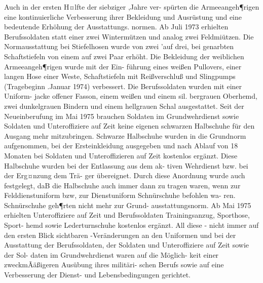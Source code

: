 

Auch in der ersten H¤lfte der siebziger ,Jahre ver-
spürten die Armeeangeh¶rigen eine kontinuierliche
Verbesserung ihrer Bekleidung und Ausrüstung
und eine bedeutende Erhöhung der Ausstattungs.
normen.
Ab Juli 1973 erhielten Berufssoldaten statt einer
zwei Wintermützen und analog zwei Feldmiützen.
Die Normausstattung bei Stiefelhosen wurde von
zwei 'auf drei, bei genarbten Schaftstiefeln von
einem auf zwei Paar erhöht. Die Bekleidung der
weiblichen Armeeangeh¶rigen wurde mit der Ein-
führung eines weißen Pullovers, einer langen Hose
einer Weste, Schaftstiefeln mit Reißverschluß und
Slingpumps (Tragebeginn .Januar 1974) verbessert.
Die Berufssoldaten wurden mit einer Uniform-
jacke offener Fasson, einem weißen und einem sil.
bergrauen Oberhemd, zwei dunkelgrauen Bindern
und einem hellgrauen Schal ausgestattet.
Seit der Neueinberufung im Mai 1975 brauchen
Soldaten im Grundwehrdienst sowie Soldaten und
Unteroffiziere auf Zeit keine eigenen schwarzen Halbschuhe für den Ausgang mehr mitzubringen.
Schwarze Halbschuhe wurden in die Grundnorm
aufgenommen, bei der Ersteinkleidung ausgegeben
und nach Ablauf von 18 Monaten bei Soldaten und
Unteroffizieren auf Zeit kostenlos ergänzt. Diese
Halbschuhe wurden bei der Entlassung aus dem ak-
tiven Wehrdienst bzw. bei der Erg¤nzung dem Trä-
ger übereignet. Durch diese Anordnung wurde
auch festgelegt, daB die Halbschuhe auch immer
dann zu tragen waren, wenn zur Felddienstuniform
bzw, zur Dienstuniform Schnürschuhe befohlen wa-
ren. Schnürschuhe geh¶rten nicht mehr zur Grund-
ausstattungsnorm.
Ab Mai 1975 erhielten Unteroffiziere auf Zeit und
Berufssoldaten Trainingsanzug, Sporthose, Sport-
hemd sowie Lederturnschuhe kostenlos ergänzt.
All diese - nicht immer auf den ersten Blick
sichtbaren -Veränderungen an den Uniformen
und bei der Ausstattung der Berufssoldaten, der
Soldaten und Unteroffiziere auf Zeit sowie der Sol-
daten im Grundwehrdienst waren auf die Möglich-
keit einer zweckmÃäßigeren Ausübung ihres militäri-
schen Berufs sowie auf eine Verbesserung der
Dienst- und Lebensbedingungen gerichtet.